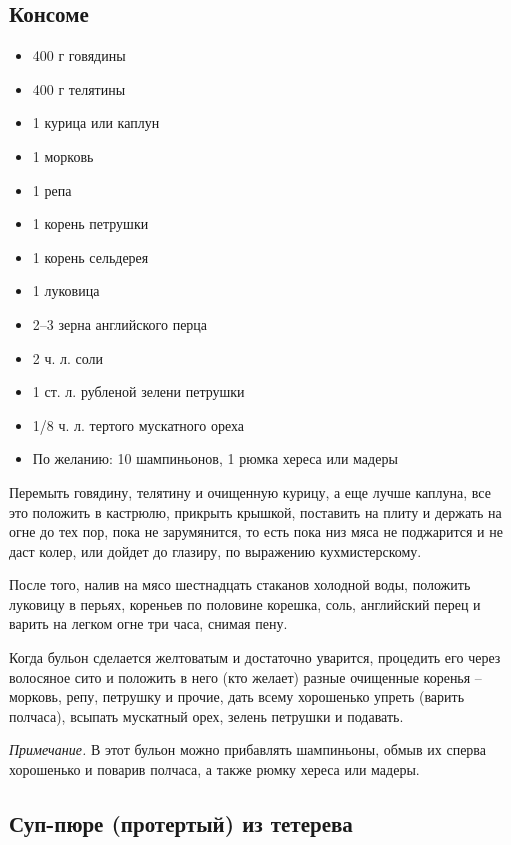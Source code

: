 \subsection{Консоме}\label{36konsome}

\begin{itemize}
	\item 400 г говядины 
    \item 400 г телятины 
    \item 1 курица или каплун
    \item 1 морковь 
    \item 1 репа
    \item 1 корень петрушки 
    \item 1 корень сельдерея
    \item 1 луковица
    \item 2–3 зерна английского перца
    \item 2 ч. л. соли
    \item 1 ст. л. рубленой зелени петрушки
    \item 1/8 ч. л. тертого мускатного ореха 
    \item По желанию: 10 шампиньонов, 1 рюмка хереса или мадеры
\end{itemize}

Перемыть говядину, телятину и очищенную курицу, а еще лучше каплуна, все это положить в кастрюлю, прикрыть крышкой, поставить на плиту и держать на огне до тех пор, пока не зарумянится, то есть пока низ мяса не поджарится и не даст колер, или дойдет до глазиру, по выражению кухмистерскому.

После того, налив на мясо шестнадцать стаканов холодной воды, положить луковицу в перьях, кореньев по половине корешка, соль, английский перец и варить на легком огне три часа, снимая пену.

Когда бульон сделается желтоватым и достаточно уварится, процедить его через волосяное сито и положить в него (кто желает) разные очищенные коренья – морковь, репу, петрушку и прочие, дать всему хорошенько упреть (варить полчаса), всыпать мускатный орех, зелень петрушки и подавать.

 \emph{Примечание.} В этот бульон можно прибавлять шампиньоны, обмыв их сперва хорошенько и поварив полчаса, а также рюмку хереса или мадеры.

\subsection{Суп-пюре (протертый) из тетерева}\label{37pure-teterev}

